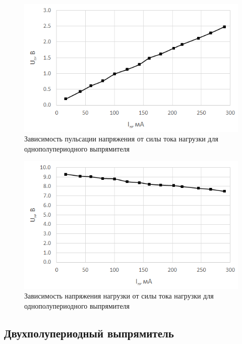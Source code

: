 \begin{figure}[H]
	\begin{center}
		\includegraphics[width=15cm]{img/2}
		\caption{Зависимость пульсации напряжения от силы тока нагрузки для однополупериодного выпрямителя}
		\label{g:2} %
	\end{center}
\end{figure}

\begin{figure}[H]
	\begin{center}
		\includegraphics[width=15cm]{img/3}
		\caption{Зависимость напряжения нагрузки от силы тока нагрузки для однополупериодного выпрямителя}
		\label{g:3} %
	\end{center}
\end{figure}
\newpage
\subsection{Двухполупериодный выпрямитель}

